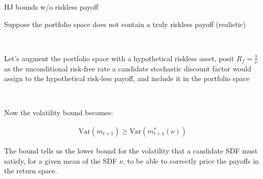 \documentclass[xcolor=table, aspectratio=169]{beamer}
\newcommand{\R}{\mathbb{R}}
\begin{document}








\begin{frame}{HJ bounds w/o riskless payoff}

Suppose the portfolio space does not contain a truly riskless payoff (realistic)

~

Let's augment the portfolio space with a hypothetical riskless asset, posit $R_f = \frac{1}{\nu}$ as the unconditional risk-free rate a candidate stochastic discount factor would assign to the hypothetical risk-less payoff, and include it in the portfolio space

~

Now the volatility bound becomes:

\begin{align*}
\text{Var}(m_{t+1}) \geq \text{Var}(m_{t+1}^*(\nu))
\end{align*}

The bound tells us the lower bound for the volatility that a candidate SDF must satisfy, for a given mean of the SDF $\nu$, to be able to correctly price the payoffs in the return space.

\end{frame}
\end{document}
